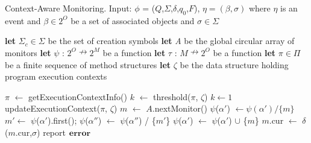\begin{algorithm}[t]
\caption[Algorithm]{Context-Aware Monitoring. Input: $\phi$ = 
($Q$,$\Sigma$,$\delta$,$q_{0}$,$F$), $\eta=(\beta, \sigma)$ where $\eta$ is an event and $\beta \in 2^O$ 
be a set of associated objects and $\sigma \in \Sigma$}          %
\label{alg1}                           %
\begin{algorithmic}[1]                  
   \STATE \textbf{let} $\Sigma_{c} \in \Sigma$ be the set of creation symbols
   \STATE \textbf{let} \textit{A} be the global circular array of monitors
    \STATE \textbf{let} $\psi$ : $2^O \nrightarrow 2^M$ be a function
   \STATE \textbf{let} $\tau$ : $M \nrightarrow 2^O$ be a function
   \STATE \textbf{let} $\pi \in \Pi$ be a finite sequence of method structures
   \STATE \textbf{let} $\zeta$ be the data structure holding program 
execution contexts
   
        \STATE $\pi$  $\leftarrow$ getExecutionContextInfo()
           \STATE $k$ $\leftarrow$ threshold($\pi$, $\zeta$)
        \ELSE
        	   \STATE $k \leftarrow 1$
        \ENDIF
        \STATE updateExecutionContext($\pi$, $\zeta$)
            	\STATE $m$ $\leftarrow$ $A$.nextMonitor()
		\STATE $\psi$($\alpha'$) $\leftarrow  \psi(\alpha') / \{m\}$
        		\ENDFOR
				 \STATE $m' \leftarrow$ $\psi$($\alpha'$).first();
					\STATE $\psi$($\alpha''$) $\leftarrow$  
$\psi$($\alpha''$) / \{$m'$\}
        				\ENDFOR
			\ENDIF
                		 \STATE $\psi$($\alpha'$) $\leftarrow$  
$\psi$($\alpha'$) $\cup$ \{$m$\}
        		\ENDFOR
        \ENDIF
 \ENDIF
     \STATE $m$.cur $\leftarrow$ $\delta$($m$.cur,$\sigma$)
        \STATE report$\hspace{5pt}\textbf{error}$
     \ENDIF
 \ENDFOR
 
\end{algorithmic}

\end{algorithm}
